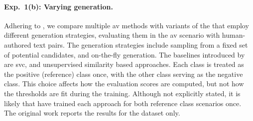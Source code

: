 %     
%     


\paragraph{Exp.\ 1(b): Varying \imp{} generation.}

Adhering to \citet{koppel_determining_2014}, we compare multiple \ac{av} methods with variants of the \impAppr{} that employ different \imp{} generation strategies, evaluating them in the \ac{av} scenario with human-authored text pairs.
The \imp{} generation strategies include sampling from a fixed set of potential \imp{} candidates, and on-the-fly \imp{} generation. 
The baselines introduced by \citet{koppel_determining_2014} are \ac{svc}, and unsupervised similarity based approaches.
Each class is treated as the positive (reference) class once, with the other class serving as the negative class. 
This choice affects how the evaluation scores are computed, but not how the thresholds are fit during the training.
Although not explicitly stated, it is likely that \citet{koppel_determining_2014} have trained each approach for both reference class scenarios once.
The original work reports the results for the \dataBlog{} dataset only.

